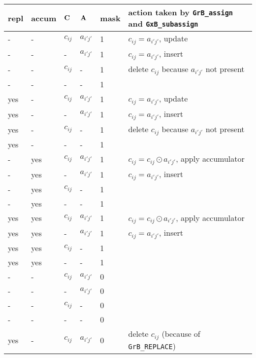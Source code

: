 \documentclass[12pt]{article}
\begin{document}
\begin{table}
{\small
\begin{tabular}{lllll|l}
\hline
repl & accum & ${\bf C}$ & ${\bf A}$ & mask & action taken by \verb'GrB_assign' and \verb'GxB_subassign'\\
\hline
    -  &-   & $c_{ij}$ & $a_{i'j'}$  & 1    &  $c_{ij} = a_{i'j'}$, update \\
    -  &-   &  -       & $a_{i'j'}$  & 1    &  $c_{ij} = a_{i'j'}$, insert \\
    -  &-   & $c_{ij}$ &  -          & 1    &  delete $c_{ij}$ because $a_{i'j'}$ not present \\
    -  &-   &  -       &  -          & 1    &   \\
\hline
    yes&-   & $c_{ij}$ & $a_{i'j'}$  & 1    &  $c_{ij} = a_{i'j'}$, update \\
    yes&-   &  -       & $a_{i'j'}$  & 1    &  $c_{ij} = a_{i'j'}$, insert \\
    yes&-   & $c_{ij}$ &  -          & 1    &  delete $c_{ij}$ because $a_{i'j'}$ not present \\
    yes&-   &  -       &  -          & 1    &   \\
\hline
    -  &yes & $c_{ij}$ & $a_{i'j'}$  & 1    &  $c_{ij} = c_{ij} \odot a_{i'j'}$, apply accumulator \\
    -  &yes &  -       & $a_{i'j'}$  & 1    &  $c_{ij} = a_{i'j'}$, insert \\
    -  &yes & $c_{ij}$ &  -          & 1    &   \\
    -  &yes &  -       &  -          & 1    &   \\
\hline
    yes&yes & $c_{ij}$ & $a_{i'j'}$  & 1    &  $c_{ij} = c_{ij} \odot a_{i'j'}$, apply accumulator \\
    yes&yes &  -       & $a_{i'j'}$  & 1    &  $c_{ij} = a_{i'j'}$, insert \\
    yes&yes & $c_{ij}$ &  -          & 1    &   \\
    yes&yes &  -       &  -          & 1    &   \\
\hline
\hline
    -  &-   & $c_{ij}$ & $a_{i'j'}$  & 0    &   \\
    -  &-   &  -       & $a_{i'j'}$  & 0    &   \\
    -  &-   & $c_{ij}$ &  -          & 0    &   \\
    -  &-   &  -       &  -          & 0    &   \\
\hline
    yes&-   & $c_{ij}$ & $a_{i'j'}$  & 0    &  delete $c_{ij}$  (because of \verb'GrB_REPLACE') \\

\end{tabular}}
\end{table}
\end{document}
